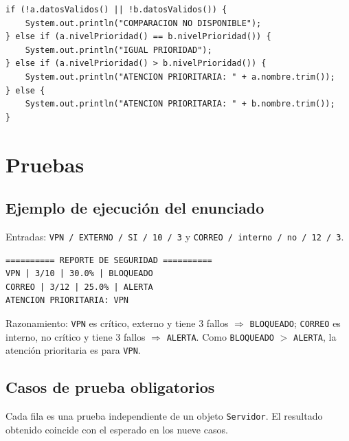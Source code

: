 \documentclass[11pt,a4paper]{article}
\begin{document}
\begin{lstlisting}
if (!a.datosValidos() || !b.datosValidos()) {
    System.out.println("COMPARACION NO DISPONIBLE");
} else if (a.nivelPrioridad() == b.nivelPrioridad()) {
    System.out.println("IGUAL PRIORIDAD");
} else if (a.nivelPrioridad() > b.nivelPrioridad()) {
    System.out.println("ATENCION PRIORITARIA: " + a.nombre.trim());
} else {
    System.out.println("ATENCION PRIORITARIA: " + b.nombre.trim());
}
\end{lstlisting}


\section{Pruebas}

\subsection{Ejemplo de ejecución del enunciado}
Entradas: \texttt{VPN / EXTERNO / SI / 10 / 3} y \texttt{CORREO / interno / no / 12 / 3}.

\begin{lstlisting}[numbers=none]
========== REPORTE DE SEGURIDAD ==========
VPN | 3/10 | 30.0% | BLOQUEADO
CORREO | 3/12 | 25.0% | ALERTA
ATENCION PRIORITARIA: VPN
\end{lstlisting}

\noindent Razonamiento: \texttt{VPN} es crítico, externo y tiene 3 fallos
$\Rightarrow$ \texttt{BLOQUEADO}; \texttt{CORREO} es interno, no crítico y tiene
3 fallos $\Rightarrow$ \texttt{ALERTA}. Como \texttt{BLOQUEADO} $>$
\texttt{ALERTA}, la atención prioritaria es para \texttt{VPN}.

\subsection{Casos de prueba obligatorios}
Cada fila es una prueba independiente de un objeto \texttt{Servidor}. El
resultado obtenido coincide con el esperado en los nueve casos.
\end{document}

